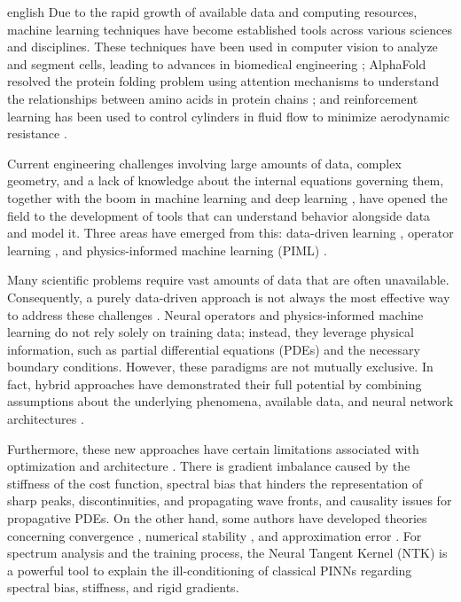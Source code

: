 \begin{hyphenrules}{english}
Due to the rapid growth of available data and computing resources, machine learning techniques have
become established tools across various sciences and disciplines. These techniques have been used in
computer vision to analyze and segment cells, leading to advances in biomedical engineering
\cite{ronneberger2015}; AlphaFold resolved the protein folding problem using attention mechanisms
to understand the relationships between amino acids in protein chains \cite{jumper2021}; and
reinforcement learning has been used to control cylinders in fluid flow to minimize aerodynamic
resistance \cite{rabault2019}.

Current engineering challenges involving large amounts of data, complex geometry, and a lack of
knowledge about the internal equations governing them, together with the boom in machine learning and
deep learning \cite{bishop2006,goodfellow2016,bach2024}, have opened the field to the development
of tools that can understand behavior alongside data and model it. Three areas have emerged from this:
data-driven learning \cite{fiorini2025,brunton2016,chen2018}, operator learning
\cite{kovachki2021,li2021fno}, and physics-informed machine learning (PIML)
\cite{raissi2019,cuomo2022}.

Many scientific problems require vast amounts of data that are often unavailable. Consequently, a
purely data-driven approach is not always the most effective way to address these challenges
\cite{wu2020}. Neural operators and physics-informed machine learning do not rely solely on
training data; instead, they leverage physical information, such as partial differential equations
(PDEs) and the necessary boundary conditions. However, these paradigms are not mutually exclusive. In
fact, hybrid approaches have demonstrated their full potential by combining assumptions about the
underlying phenomena, available data, and neural network architectures
\cite{raissi2020hidden,kissas2020,nguyen2022}.

Furthermore, these new approaches have certain limitations associated with optimization \cite{wang2021gradient,wang2022ntk,krishnapriyan2021,deshpande2022,nguyen2023} and architecture \cite{rahaman2019,cao2020spectral,wang2021deeponet}. There is gradient imbalance caused by the stiffness of the cost function, spectral bias that hinders the representation of sharp peaks, discontinuities, and propagating wave fronts, and causality issues for propagative PDEs. On the other
hand, some authors have developed theories concerning convergence
\cite{mishra2025,siegel2024,shin2020convergence}, numerical stability
\cite{deryck2024acta,dong2024}, and approximation error \cite{zeinhofer2024,chantada2024}.
For spectrum analysis and the training process, the Neural Tangent Kernel (NTK) is a powerful tool to
explain the ill-conditioning of classical PINNs \cite{jacot2018,wang2022ntk} regarding spectral
bias, stiffness, and rigid gradients.


\end{hyphenrules}
